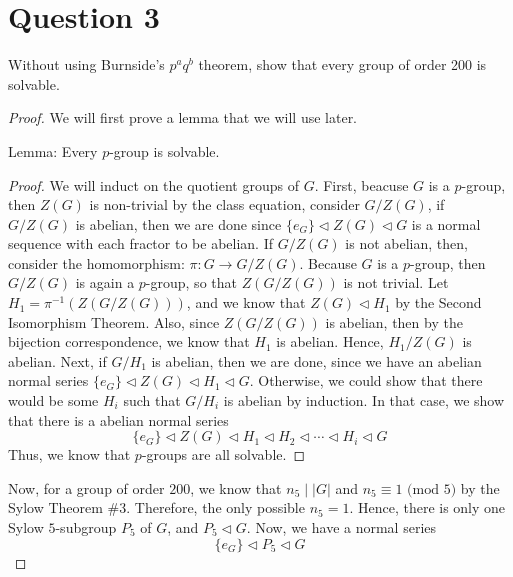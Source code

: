 \section{Question 3}

\begin{question}
    Without using Burnside's $p^a q^b$ theorem, show that every group of order 200 is solvable.
\end{question}

\begin{answer}
    \begin{proof}
        We will first prove a lemma that we will use later.
        
        Lemma: Every $p$-group is solvable.
        \begin{proof}
            We will induct on the quotient groups of $G$. First, beacuse $G$ is a $p$-group, then $Z(G)$ is non-trivial by the class equation, consider $G/Z(G)$, if $G/Z(G)$ is abelian, then we are done since $\{e_G\} \triangleleft Z(G) \triangleleft G$ is a normal sequence with each fractor to be abelian. If $G/Z(G)$ is not abelian, then, consider the homomorphism: $\pi: G \to G/Z(G)$. Because $G$ is a $p$-group, then $G/Z(G)$ is again a $p$-group, so that $Z(G/Z(G))$ is not trivial. Let $H_1 = \pi^{-1}(Z(G/Z(G)))$, and we know that $Z(G) \triangleleft H_1$ by the Second Isomorphism Theorem. Also, since $Z(G/Z(G))$ is abelian, then by the bijection correspondence, we know that $H_1$ is abelian. Hence, $H_1/Z(G)$ is abelian. Next, if $G/H_1$ is abelian, then we are done, since we have an abelian normal series $\{e_G\} \triangleleft Z(G) \triangleleft H_1 \triangleleft G$. Otherwise, we could show that there would be some $H_i$ such that $G/H_i$ is abelian by induction. In that case, we show that there is a abelian normal series
            \begin{equation}
                \{e_G\} \triangleleft Z(G) \triangleleft H_1 \triangleleft H_2 \triangleleft \cdots \triangleleft H_i \triangleleft G
            \end{equation}
            Thus, we know that $p$-groups are all solvable.
        \end{proof}
        Now, for a group of order $200$, we know that $n_5 \mid \lvert G \rvert$ and $n_5 \equiv 1 \text{ (mod 5)}$ by the Sylow Theorem \#3. Therefore, the only possible $n_5 = 1$. Hence, there is only one Sylow $5$-subgroup $P_5$ of $G$, and $P_5 \triangleleft G$. Now, we have a normal series
        \begin{equation}
            \{e_G\} \triangleleft P_5 \triangleleft G

\end{equation}
\end{proof}
\end{answer}

